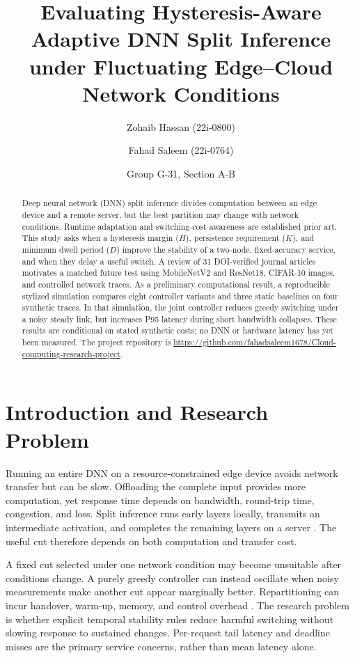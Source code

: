 \documentclass[10pt,a4paper,twocolumn]{article}
\title{Evaluating Hysteresis-Aware Adaptive DNN Split Inference\\under Fluctuating Edge--Cloud Network Conditions}
\author{Zohaib Hassan (22i-0800) \and Fahad Saleem (22i-0764)}
\date{Group G-31, Section A-B}
\begin{document}
\maketitle
\vspace{-1.5em}

\begin{abstract}
Deep neural network (DNN) split inference divides computation between an edge device and a remote server, but the best partition may change with network conditions. Runtime adaptation and switching-cost awareness are established prior art. This study asks when a hysteresis margin ($H$), persistence requirement ($K$), and minimum dwell period ($D$) improve the stability of a two-node, fixed-accuracy service, and when they delay a useful switch. A review of 31 DOI-verified journal articles motivates a matched future test using MobileNetV2 and ResNet18, CIFAR-10 images, and controlled network traces. As a preliminary computational result, a reproducible stylized simulation compares eight controller variants and three static baselines on four synthetic traces. In that simulation, the joint controller reduces greedy switching under a noisy steady link, but increases P95 latency during short bandwidth collapses. These results are conditional on stated synthetic costs; no DNN or hardware latency has yet been measured. The project repository is \url{https://github.com/fahadsaleem1678/Cloud-computing-research-project}.
\end{abstract}

\section{Introduction and Research Problem}
Running an entire DNN on a resource-constrained edge device avoids network transfer but can be slow. Offloading the complete input provides more computation, yet response time depends on bandwidth, round-trip time, congestion, and loss. Split inference runs early layers locally, transmits an intermediate activation, and completes the remaining layers on a server \cite{edgent,survey}. The useful cut therefore depends on both computation and transfer cost.

A fixed cut selected under one network condition may become unsuitable after conditions change. A purely greedy controller can instead oscillate when noisy measurements make another cut appear marginally better. Repartitioning can incur handover, warm-up, memory, and control overhead \cite{serverless,rap}. The research problem is whether explicit temporal stability rules reduce harmful switching without slowing response to sustained changes. Per-request tail latency and deadline misses are the primary service concerns, rather than mean latency alone.
\end{document}
